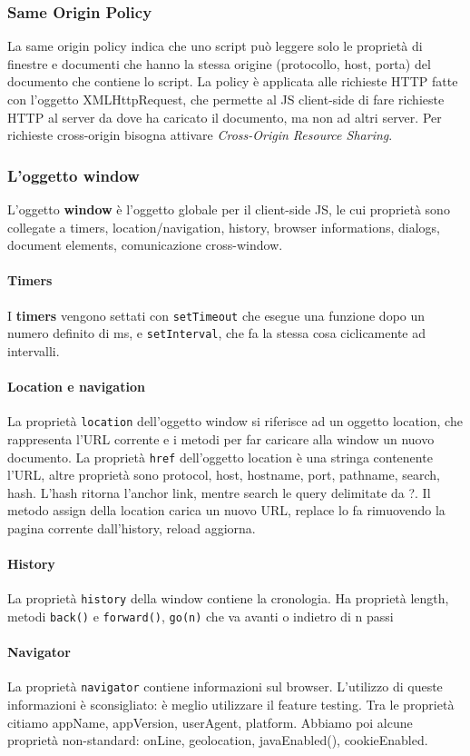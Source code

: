 \documentclass[11pt]{article}
\newcommand{\code}[1]{\texttt{#1}}
\begin{document}
\subsubsection{Same Origin Policy}
La same origin policy indica che uno script può leggere solo le proprietà di finestre e documenti che hanno la stessa origine (protocollo, host, porta) del documento che contiene lo script. La policy è applicata alle richieste HTTP fatte con l'oggetto XMLHttpRequest, che permette al JS client-side di fare richieste HTTP al server da dove ha caricato il documento, ma non ad altri server. Per richieste cross-origin bisogna attivare \textit{Cross-Origin Resource Sharing}. 
\subsubsection{L'oggetto window}
L'oggetto \textbf{window} è l'oggetto globale per il client-side JS, le cui proprietà sono collegate a timers, location/navigation, history, browser informations, dialogs, document elements, comunicazione cross-window. 
\paragraph{Timers} I \textbf{timers} vengono settati con \code{setTimeout} che esegue una funzione dopo un numero definito di ms, e \code{setInterval}, che fa la stessa cosa ciclicamente ad intervalli.
\paragraph{Location e navigation} La proprietà \code{location} dell'oggetto window si riferisce ad un oggetto location, che rappresenta l'URL corrente e i metodi per far caricare alla window un nuovo documento. La proprietà \code{href} dell'oggetto location è una stringa contenente l'URL, altre proprietà sono protocol, host, hostname, port, pathname, search, hash. L'hash ritorna l'anchor link, mentre search le query delimitate da ?. Il metodo assign della location carica un nuovo URL, replace lo fa rimuovendo la pagina corrente dall'history, reload aggiorna. 
\paragraph{History} La proprietà \code{history} della window contiene la cronologia. Ha proprietà length, metodi \code{back()} e \code{forward()}, \code{go(n)} che va avanti o indietro di n passi
\paragraph{Navigator} La proprietà \code{navigator} contiene informazioni sul browser. L'utilizzo di queste informazioni è sconsigliato: è meglio utilizzare il feature testing. Tra le proprietà citiamo appName, appVersion, userAgent, platform. Abbiamo poi alcune proprietà non-standard: onLine, geolocation, javaEnabled(), cookieEnabled.
\end{document}
